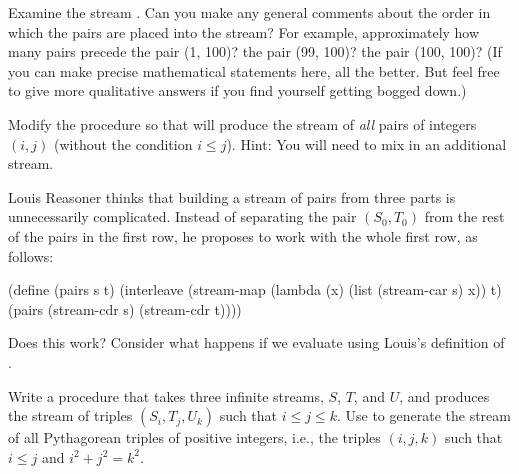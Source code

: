 \begin{exerciseGroup}
\label{Exercise 3.66}
 Examine the stream . Can you make any general comments about the order in which
the pairs are placed into the stream? For example, approximately how many pairs precede
the pair (1, 100)?  the pair (99, 100)? the pair (100, 100)? (If you can make
precise mathematical statements here, all the better. But feel free to give
more qualitative answers if you find yourself getting bogged down.)

\label{Exercise 3.67}
 Modify the  procedure
so that  will produce the stream of \emph{all}
pairs of integers \( (i, j) \) (without the condition \( i \le j \)).  Hint:
You will need to mix in an additional stream.

\label{Exercise 3.68}
 Louis Reasoner thinks that
building a stream of pairs from three parts is unnecessarily complicated.
Instead of separating the pair \( (S_0, T_0) \) from the rest of the pairs in
the first row, he proposes to work with the whole first row, as follows:

\begin{codeBlock}
(define (pairs s t)
  (interleave
   (stream-map (lambda (x) (list (stream-car s) x))
               t)
   (pairs (stream-cdr s) (stream-cdr t))))
\end{codeBlock}

Does this work?  Consider what happens if we evaluate  using Louis's definition of .

\label{Exercise 3.69}
 Write a procedure 
that takes three infinite streams, \( S \), \( T \), and \( U \), and produces the
stream of triples \( (S_i, T_j, U_k) \) such that \( i \le j \le k \).
Use  to generate the stream of all Pythagorean
triples of positive integers, i.e., the triples \( (i, j, k) \) such that
\( i \le j \) and \( i^2 + j^2 = k^2 \).


\end{exerciseGroup}

